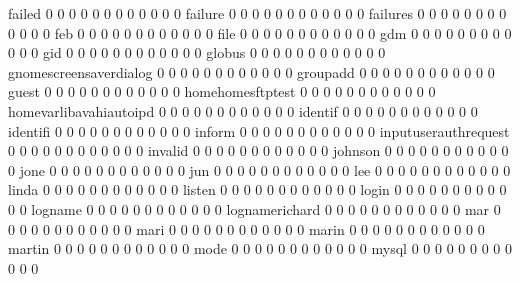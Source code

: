\documentclass[compress,8pt]{beamer}
\begin{document}
\begin{frame}
\begin{Schunk}
  failed                                    0  0  0  0  0  0  0  0  0  0  0  0
  failure                                   0  0  0  0  0  0  0  0  0  0  0  0
  failures                                  0  0  0  0  0  0  0  0  0  0  0  0
  feb                                       0  0  0  0  0  0  0  0  0  0  0  0
  file                                      0  0  0  0  0  0  0  0  0  0  0  0
  gdm                                       0  0  0  0  0  0  0  0  0  0  0  0
  gid                                       0  0  0  0  0  0  0  0  0  0  0  0
  globus                                    0  0  0  0  0  0  0  0  0  0  0  0
  gnomescreensaverdialog                    0  0  0  0  0  0  0  0  0  0  0  0
  groupadd                                  0  0  0  0  0  0  0  0  0  0  0  0
  guest                                     0  0  0  0  0  0  0  0  0  0  0  0
  homehomesftptest                          0  0  0  0  0  0  0  0  0  0  0  0
  homevarlibavahiautoipd                    0  0  0  0  0  0  0  0  0  0  0  0
  identif                                   0  0  0  0  0  0  0  0  0  0  0  0
  identifi                                  0  0  0  0  0  0  0  0  0  0  0  0
  inform                                    0  0  0  0  0  0  0  0  0  0  0  0
  inputuserauthrequest                      0  0  0  0  0  0  0  0  0  0  0  0
  invalid                                   0  0  0  0  0  0  0  0  0  0  0  0
  johnson                                   0  0  0  0  0  0  0  0  0  0  0  0
  jone                                      0  0  0  0  0  0  0  0  0  0  0  0
  jun                                       0  0  0  0  0  0  0  0  0  0  0  0
  lee                                       0  0  0  0  0  0  0  0  0  0  0  0
  linda                                     0  0  0  0  0  0  0  0  0  0  0  0
  listen                                    0  0  0  0  0  0  0  0  0  0  0  0
  login                                     0  0  0  0  0  0  0  0  0  0  0  0
  logname                                   0  0  0  0  0  0  0  0  0  0  0  0
  lognamerichard                            0  0  0  0  0  0  0  0  0  0  0  0
  mar                                       0  0  0  0  0  0  0  0  0  0  0  0
  mari                                      0  0  0  0  0  0  0  0  0  0  0  0
  marin                                     0  0  0  0  0  0  0  0  0  0  0  0
  martin                                    0  0  0  0  0  0  0  0  0  0  0  0
  mode                                      0  0  0  0  0  0  0  0  0  0  0  0
  mysql                                     0  0  0  0  0  0  0  0  0  0  0  0

\end{Schunk}
\end{frame}
\end{document}
